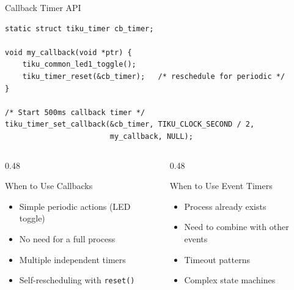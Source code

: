 \documentclass[aspectratio=169, 10pt]{beamer}
\begin{document}
\begin{frame}[fragile]{Callback Timer API}
\begin{lstlisting}[style=cstyle, title={Set a callback timer}]
static struct tiku_timer cb_timer;

void my_callback(void *ptr) {
    tiku_common_led1_toggle();
    tiku_timer_reset(&cb_timer);   /* reschedule for periodic */
}

/* Start 500ms callback timer */
tiku_timer_set_callback(&cb_timer, TIKU_CLOCK_SECOND / 2,
                        my_callback, NULL);
\end{lstlisting}

\vspace{0.3em}
\begin{columns}[T]
\begin{column}{0.48\textwidth}
\begin{block}{When to Use Callbacks}
\begin{itemize}
  \item Simple periodic actions (LED toggle)
  \item No need for a full process
  \item Multiple independent timers
  \item Self-rescheduling with \texttt{reset()}
\end{itemize}
\end{block}
\end{column}
\begin{column}{0.48\textwidth}
\begin{block}{When to Use Event Timers}
\begin{itemize}
  \item Process already exists
  \item Need to combine with other events
  \item Timeout patterns
  \item Complex state machines
\end{itemize}
\end{block}
\end{column}
\end{columns}
\end{frame}
\end{document}
